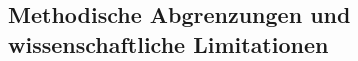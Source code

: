 \documentclass[11pt,a4paper]{article}
\begin{document}
    \subsection{Methodische Abgrenzungen und wissenschaftliche Limitationen}
\end{document}
